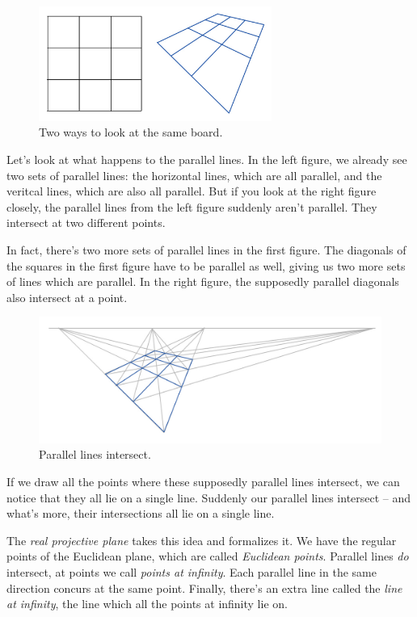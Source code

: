 \documentclass[11pt,paper=letter]{scrartcl}
\begin{document}
\begin{figure}
\centering
\includegraphics[width=3in]{twothreebythree.jpg}
\caption{Two ways to look at the same board.}
\end{figure}

Let's look at what happens to the parallel lines. In the left figure, we already see two sets of parallel lines: the horizontal lines, which are all parallel, and the veritcal lines, which are also all parallel. But if you look at the right figure closely, the parallel lines from the left figure suddenly aren't parallel. They intersect at two different points.

In fact, there's two more sets of parallel lines in the first figure. The diagonals of the squares in the first figure have to be parallel as well, giving us two more sets of lines which are parallel. In the right figure, the supposedly parallel diagonals also intersect at a point.

\begin{figure}
\centering
\includegraphics[width=\textwidth]{two-point.jpg}
\caption{Parallel lines intersect.}
\end{figure}

If we draw all the points where these supposedly parallel lines intersect, we can notice that they all lie on a single line. Suddenly our parallel lines intersect -- and what's more, their intersections all lie on a single line.

The \emph{real projective plane} takes this idea and formalizes it. We have the regular points of the Euclidean plane, which are called \emph{Euclidean points}. Parallel lines \emph{do} intersect, at points we call \emph{points at infinity}. Each parallel line in the same direction concurs at the same point. Finally, there's an extra line called the \emph{line at infinity}, the line which all the points at infinity lie on.
\end{document}
